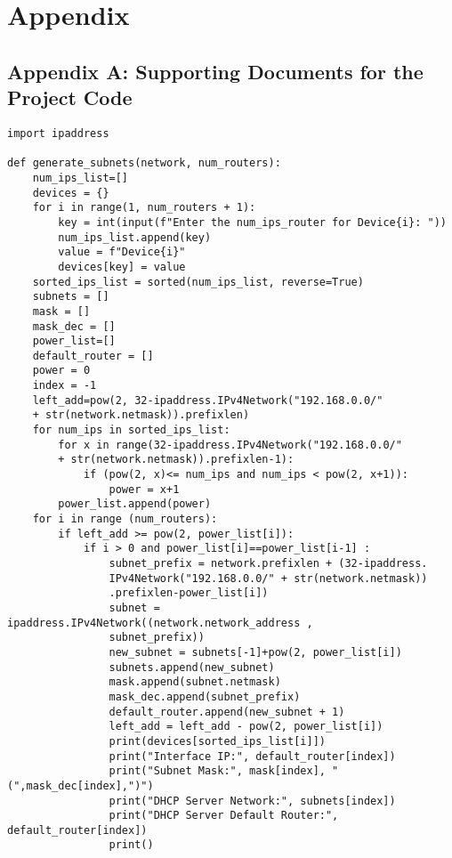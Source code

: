 \chapter*{Appendix}

\section{Appendix A: Supporting Documents for the Project Code}


\begin{lstlisting}[style=pythonStyle, caption={Automated Subnet Allocation.}, backgroundcolor=\color{codebackground}]
import ipaddress

def generate_subnets(network, num_routers):
    num_ips_list=[]
    devices = {}
    for i in range(1, num_routers + 1):
        key = int(input(f"Enter the num_ips_router for Device{i}: "))
        num_ips_list.append(key)
        value = f"Device{i}"
        devices[key] = value
    sorted_ips_list = sorted(num_ips_list, reverse=True)
    subnets = []
    mask = []
    mask_dec = []
    power_list=[]
    default_router = []
    power = 0
    index = -1
    left_add=pow(2, 32-ipaddress.IPv4Network("192.168.0.0/" 
    + str(network.netmask)).prefixlen)
    for num_ips in sorted_ips_list:
        for x in range(32-ipaddress.IPv4Network("192.168.0.0/" 
        + str(network.netmask)).prefixlen-1):
            if (pow(2, x)<= num_ips and num_ips < pow(2, x+1)):
                power = x+1
        power_list.append(power)
    for i in range (num_routers):
        if left_add >= pow(2, power_list[i]):
            if i > 0 and power_list[i]==power_list[i-1] :
                subnet_prefix = network.prefixlen + (32-ipaddress.
                IPv4Network("192.168.0.0/" + str(network.netmask))
                .prefixlen-power_list[i])
                subnet = ipaddress.IPv4Network((network.network_address , 
                subnet_prefix))
                new_subnet = subnets[-1]+pow(2, power_list[i]) 
                subnets.append(new_subnet)
                mask.append(subnet.netmask)
                mask_dec.append(subnet_prefix)
                default_router.append(new_subnet + 1)
                left_add = left_add - pow(2, power_list[i])
                print(devices[sorted_ips_list[i]])
                print("Interface IP:", default_router[index])
                print("Subnet Mask:", mask[index], "(",mask_dec[index],")")
                print("DHCP Server Network:", subnets[index])
                print("DHCP Server Default Router:", default_router[index])
                print()
            

\end{lstlisting}

